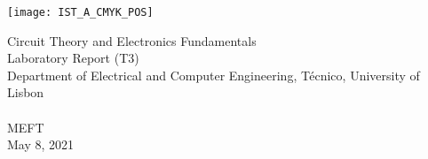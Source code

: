 
\thispagestyle {empty}

\texttt{[image: IST\_A\_CMYK\_POS]}

\begin{center}
%
\vspace{1.0cm}

\vspace{1cm}
{\FontLb Circuit Theory and Electronics Fundamentals} \\ %
\vspace{1cm}
{\FontLb Laboratory Report (T3)} \\
\vspace{1cm}
{\FontSn Department of Electrical and Computer Engineering, Técnico, University of Lisbon} \\ %
\vspace{0.5cm}
{ } \\
\vspace{0.5cm}
{\FontSn MEFT } \\
\vspace{0.5cm}
{\FontSn May 8, 2021} \\ %
%
\end{center}


